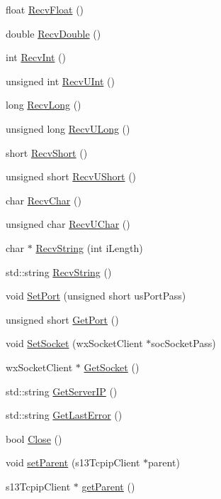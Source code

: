 \begin{DoxyCompactItemize}
\item 
float \hyperlink{classs13_w_x_w_client_a602fb8942de4508ba1cdd5bce46522a3}{Recv\+Float} ()
\item 
double \hyperlink{classs13_w_x_w_client_a3e3578a38f18317969484a7f01877d58}{Recv\+Double} ()
\item 
int \hyperlink{classs13_w_x_w_client_a0d8b73a0f5ea4cc1d294e0f977a62bfd}{Recv\+Int} ()
\item 
unsigned int \hyperlink{classs13_w_x_w_client_a5eb33c0a4f6f07372db53cf9f92f78f8}{Recv\+U\+Int} ()
\item 
long \hyperlink{classs13_w_x_w_client_ad62530f01a85007b4e1e0edc889e6d4f}{Recv\+Long} ()
\item 
unsigned long \hyperlink{classs13_w_x_w_client_afca0019d811b5dd8647762fe72531657}{Recv\+U\+Long} ()
\item 
short \hyperlink{classs13_w_x_w_client_a5f4f7e6a3b23ca238301d8f127802f09}{Recv\+Short} ()
\item 
unsigned short \hyperlink{classs13_w_x_w_client_ad3be3bbaff3762ec8aaedfd8a436a101}{Recv\+U\+Short} ()
\item 
char \hyperlink{classs13_w_x_w_client_a1342514cdc6d1e9e870b431e0fe68abf}{Recv\+Char} ()
\item 
unsigned char \hyperlink{classs13_w_x_w_client_a066ed6b5b1ebab37a7aaa4b6598b1df1}{Recv\+U\+Char} ()
\item 
char $\ast$ \hyperlink{classs13_w_x_w_client_a4274a080514dbf24713eabbc80b58dc6}{Recv\+String} (int i\+Length)
\item 
std\+::string \hyperlink{classs13_w_x_w_client_a1008926c850498c4a1afae3416e32a24}{Recv\+String} ()
\item 
void \hyperlink{classs13_w_x_w_client_a06839c010644e2f6dd0c6bab774cfdc8}{Set\+Port} (unsigned short us\+Port\+Pass)
\item 
unsigned short \hyperlink{classs13_w_x_w_client_a440c84a2dbcdab8c46b6c139ba52dd4a}{Get\+Port} ()
\item 
void \hyperlink{classs13_w_x_w_client_a4806b4a9f1bb66aeef4e8029fa874c86}{Set\+Socket} (wx\+Socket\+Client $\ast$soc\+Socket\+Pass)
\item 
wx\+Socket\+Client $\ast$ \hyperlink{classs13_w_x_w_client_ad116ec3275e73d7e8645abd4cb68ae62}{Get\+Socket} ()
\item 
std\+::string \hyperlink{classs13_w_x_w_client_a66414681a1220a0689be2f0c268e3d07}{Get\+Server\+IP} ()
\item 
std\+::string \hyperlink{classs13_w_x_w_client_a5e006c11c79511eeab84669c68f09324}{Get\+Last\+Error} ()
\item 
bool \hyperlink{classs13_w_x_w_client_a871e95c530bbf9317f87e11bd04b0421}{Close} ()
\item 
void \hyperlink{classs13_w_x_w_client_a373e5161035a54096dbc4c9c053a87cf}{set\+Parent} (s13\+Tcpip\+Client $\ast$parent)
\item 
s13\+Tcpip\+Client $\ast$ \hyperlink{classs13_w_x_w_client_a3b47755ef0a547445e7b29193a922164}{get\+Parent} ()
\end{DoxyCompactItemize}


